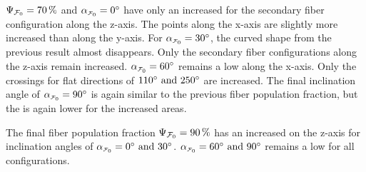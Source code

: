 \par
%
$\textnormal{$\Psi_{\textnormal{$\mathcal{F}_0$}}$}=\SI{70}{\percent}$ and $\modelInc=\SI{0}{\degree}$ have only an increased \rvalue{} for the secondary fiber configuration along the z-axis.
The points along the x-axis are slightly more increased than along the y-axis.
For $\modelInc=\SI{30}{\degree}$, the curved shape from the previous result almost disappears.
Only the secondary fiber configurations along the z-axis remain increased.
$\modelInc=\SI{60}{\degree}$ remains a low \rvalue{} along the x-axis.
Only the crossings for flat directions of $\SIlist{110;250}{\degree}$ are increased.
The final inclination angle of $\modelInc=\SI{90}{\degree}$ is again similar to the previous fiber population fraction, but the \rvalue{} is again lower for the increased areas.
\par
% 
The final fiber population fraction $\textnormal{$\Psi_{\textnormal{$\mathcal{F}_0$}}$}=\SI{90}{\percent}$ has an increased \rvalue{} on the z-axis for inclination angles of $\modelInc=\SIlist{0;30}{\degree}$.
$\modelInc=\SIlist{60;90}{\degree}$ remains a low \rvalue{} for all configurations.
% 
% 
% 
